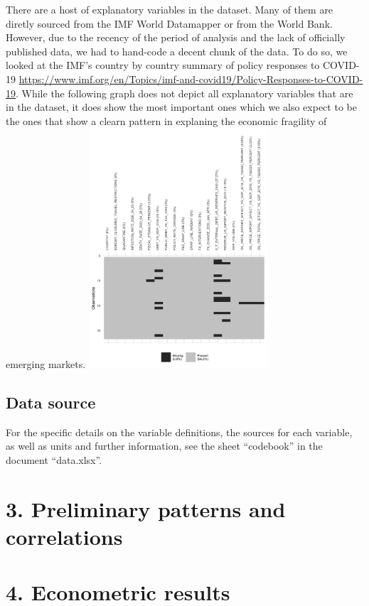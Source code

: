 \documentclass[11pt,]{article}
\begin{document}
There are a host of explanatory variables in the dataset. Many of them
are diretly sourced from the IMF World Datamapper or from the World
Bank. However, due to the recency of the period of analysis and the lack
of officially published data, we had to hand-code a decent chunk of the
data. To do so, we looked at the IMF's country by country summary of
policy responses to COVID-19
\url{https://www.imf.org/en/Topics/imf-and-covid19/Policy-Responses-to-COVID-19}.
While the following graph does not depict all explanatory variables that
are in the dataset, it does show the most important ones which we also
expect to be the ones that show a clearn pattern in explaning the
economic fragility of emerging markets.
\includegraphics[width=0.5\textwidth,height=\textheight]{reportfigures/missingdata_predictors.png}

\hypertarget{data-source}{%
\subsection{Data source}\label{data-source}}

For the specific details on the variable definitions, the sources for
each variable, as well as units and further information, see the sheet
``codebook'' in the document ``data.xlsx''.

\hypertarget{preliminary-patterns-and-correlations}{%
\section{3. Preliminary patterns and
correlations}\label{preliminary-patterns-and-correlations}}

\hypertarget{econometric-results}{%
\section{4. Econometric results}\label{econometric-results}}
\end{document}
